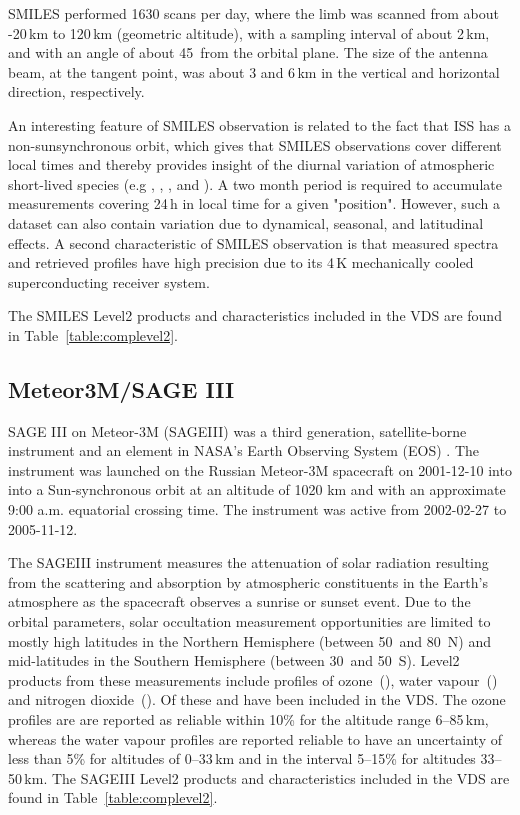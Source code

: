 SMILES performed 1630 scans per day, where the limb was scanned
from about -20\,km to 120\,km (geometric altitude), 
with a sampling interval of about 2\,km, and with an angle of 
about 45\degree\ from the orbital plane. The size of the antenna beam, 
at the tangent point, was about 3 and 6\,km in the vertical and 
horizontal direction, respectively. 

An interesting feature of SMILES observation is related to the fact
that ISS has a non-sunsynchronous orbit, which gives that SMILES 
observations cover different local times and thereby provides insight
of the diurnal variation of atmospheric short-lived species
(e.g , , , and ). 
A two month period is required to accumulate measurements covering 
24\,h in local time for a given "position". However, such a 
dataset can also contain variation due to dynamical, seasonal, and 
latitudinal effects.
A second characteristic of SMILES observation is that 
measured spectra and retrieved profiles have high precision due 
to its 4\,K mechanically cooled superconducting receiver system.

The SMILES Level2 products and characteristics included in the
VDS are found in Table~\ref{table:complevel2}.


\subsection{Meteor3M/SAGE III}

SAGE III on Meteor-3M (SAGEIII) was a third generation, satellite-borne
instrument and an element in NASA's Earth Observing System (EOS) \citep{SAGEIII_DPUG}. 
The instrument was launched on the Russian Meteor-3M spacecraft on 2001-12-10
into into a Sun-synchronous orbit at an altitude of 1020 km and with an
approximate 9:00 a.m. equatorial crossing time.  The instrument was active from
2002-02-27 to 2005-11-12.

The SAGEIII instrument measures the attenuation of solar radiation resulting
from the scattering and absorption by atmospheric constituents in the Earth's
atmosphere as the spacecraft observes a sunrise or sunset event.  Due to the
orbital parameters, solar occultation measurement opportunities are limited to
mostly high latitudes in the Northern Hemisphere (between 50\degree~and
80\degree~N) and mid-latitudes in the Southern Hemisphere (between
30\degree~and 50\degree~S).  Level2 products from these measurements include
profiles of ozone~(), water vapour~() and nitrogen
dioxide~().  Of these  and  have been included
in the VDS.  The ozone profiles are are reported as reliable within 10\% for
the altitude range 6--85\,km, whereas the water vapour profiles are reported
reliable to have an uncertainty of less than 5\% for altitudes of 0--33\,km and
in the interval 5--15\% for altitudes 33--50\,km. The SAGEIII Level2
products and characteristics included in the VDS are found in
Table~\ref{table:complevel2}.

